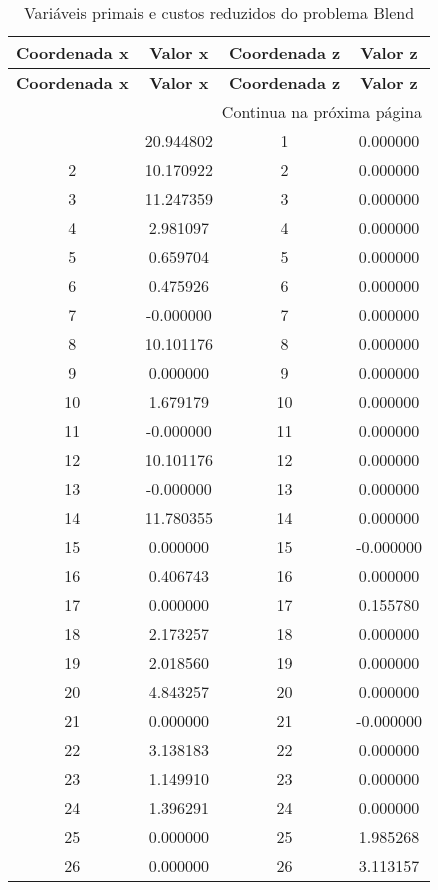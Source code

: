 \documentclass[12pt]{article}
\begin{document}
\begin{longtable}{@{}cccc@{}}
\caption{Variáveis primais e custos reduzidos do problema Blend} \\
\toprule
\textbf{Coordenada x} & \textbf{Valor x} & \textbf{Coordenada z} & \textbf{Valor z} \\
\midrule
\endfirsthead

\toprule
\textbf{Coordenada x} & \textbf{Valor x} & \textbf{Coordenada z} & \textbf{Valor z} \\
\midrule
\endhead

\midrule \multicolumn{4}{r}{{Continua na próxima página}} \\ \midrule
\endfoot

\bottomrule
\endlastfoot
1 & 20.944802 & 1 & 0.000000 \\
2 & 10.170922 & 2 & 0.000000 \\
3 & 11.247359 & 3 & 0.000000 \\
4 & 2.981097 & 4 & 0.000000 \\
5 & 0.659704 & 5 & 0.000000 \\
6 & 0.475926 & 6 & 0.000000 \\
7 & -0.000000 & 7 & 0.000000 \\
8 & 10.101176 & 8 & 0.000000 \\
9 & 0.000000 & 9 & 0.000000 \\
10 & 1.679179 & 10 & 0.000000 \\
11 & -0.000000 & 11 & 0.000000 \\
12 & 10.101176 & 12 & 0.000000 \\
13 & -0.000000 & 13 & 0.000000 \\
14 & 11.780355 & 14 & 0.000000 \\
15 & 0.000000 & 15 & -0.000000 \\
16 & 0.406743 & 16 & 0.000000 \\
17 & 0.000000 & 17 & 0.155780 \\
18 & 2.173257 & 18 & 0.000000 \\
19 & 2.018560 & 19 & 0.000000 \\
20 & 4.843257 & 20 & 0.000000 \\
21 & 0.000000 & 21 & -0.000000 \\
22 & 3.138183 & 22 & 0.000000 \\
23 & 1.149910 & 23 & 0.000000 \\
24 & 1.396291 & 24 & 0.000000 \\
25 & 0.000000 & 25 & 1.985268 \\
26 & 0.000000 & 26 & 3.113157 \\

\end{longtable}
\end{document}
